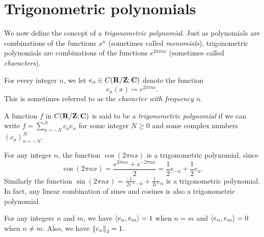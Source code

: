 \section{Trigonometric polynomials}\label{sec 5.3}

\begin{note}
  We now define the concept of a \emph{trigonometric polynomial}.
  Just as polynomials are combinations of the functions \(x^n\) (sometimes called \emph{monomials}), trigonometric polynomials are combinations of the functions \(e^{2 \pi i n x}\) (sometimes called \emph{characters}).
\end{note}

\begin{definition}[Characters]\label{5.3.1}
  For every integer \(n\), we let \(e_n \in C(\R / \Z ; \C)\) denote the function
  \[
    e_n(x) \coloneqq e^{2 \pi i n x}.
  \]
  This is sometimes referred to as the \emph{character with frequency \(n\)}.
\end{definition}

\begin{definition}\label{5.3.2}
  A function \(f\) in \(C(\R / \Z ; \C)\) is said to be a \emph{trigonometric polynomial} if we can write
  \(f = \sum_{n = -N}^N c_n e_n\) for some integer \(N \geq 0\) and some complex numbers \((c_n)_{n = -N}^N\).
\end{definition}

\setcounter{theorem}{3}
\begin{example}\label{5.3.4}
  For any integer \(n\), the function \(\cos(2 \pi n x)\) is a trigonometric polynomial, since
  \[
    \cos(2 \pi n x) = \frac{e^{2 \pi n x} + e^{- 2 \pi n x}}{2} = \frac{1}{2} e_{-n} + \frac{1}{2} e_n.
  \]
  Similarly the function \(\sin(2 \pi n x) = \frac{-1}{2i} e_{-n} + \frac{1}{2i} e_n\) is a trigonometric polynomial.
  In fact, any linear combination of sines and cosines is also a trigonometric polynomial.
\end{example}

\begin{lemma}\label{5.3.5}
  For any integers \(n\) and \(m\), we have \(\inner*{e_n, e_m} = 1\) when \(n = m\) and \(\inner*{e_n, e_m} = 0\) when \(n \neq m\).
  Also, we have \(\norm*{e_n}_2 = 1\).
\end{lemma}

